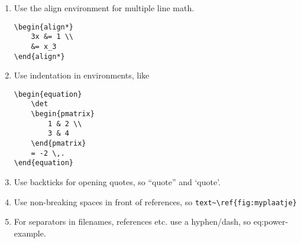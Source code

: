 \documentclass[11pt]{article}
\begin{document}
\begin{enumerate}
        \item Use the align environment for multiple line math.
            \begin{lstlisting}
\begin{align*}
    3x &= 1 \\
    &= x_3
\end{align*}
            \end{lstlisting}

        \item Use indentation in environments, like
            \begin{lstlisting}
\begin{equation}
    \det
    \begin{pmatrix}
        1 & 2 \\
        3 & 4
    \end{pmatrix}
    = -2 \,.
\end{equation}
            \end{lstlisting}
        \item Use backticks for opening quotes, so ``quote'' and `quote'.
        \item Use non-breaking spaces in front of references, so \verb|text~\ref{fig:myplaatje}|
        \item For separators in filenames, references etc. use a hyphen/dash, so eq:power-example.
    \end{enumerate}
\end{document}
